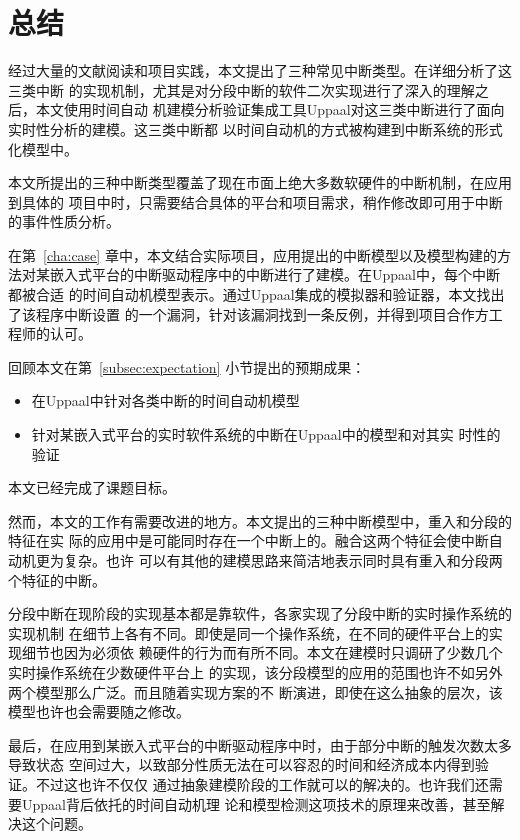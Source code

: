 
\chapter{总结}
\label{cha:sum}

经过大量的文献阅读和项目实践，本文提出了三种常见中断类型。在详细分析了这三类中断
的实现机制，尤其是对分段中断的软件二次实现进行了深入的理解之后，本文使用时间自动
机建模分析验证集成工具Uppaal对这三类中断进行了面向实时性分析的建模。这三类中断都
以时间自动机的方式被构建到中断系统的形式化模型中。

本文所提出的三种中断类型覆盖了现在市面上绝大多数软硬件的中断机制，在应用到具体的
项目中时，只需要结合具体的平台和项目需求，稍作修改即可用于中断的事件性质分析。

在第~\ref{cha:case} 章中，本文结合实际项目，应用提出的中断模型以及模型构建的方
法对某嵌入式平台的中断驱动程序中的中断进行了建模。在Uppaal中，每个中断都被合适
的时间自动机模型表示。通过Uppaal集成的模拟器和验证器，本文找出了该程序中断设置
的一个漏洞，针对该漏洞找到一条反例，并得到项目合作方工程师的认可。

回顾本文在第~\ref{subsec:expectation} 小节提出的预期成果：

\begin{itemize}
	\item 在Uppaal中针对各类中断的时间自动机模型
	\item 针对某嵌入式平台的实时软件系统的中断在Uppaal中的模型和对其实
	时性的验证
\end{itemize}

本文已经完成了课题目标。

然而，本文的工作有需要改进的地方。本文提出的三种中断模型中，重入和分段的特征在实
际的应用中是可能同时存在一个中断上的。融合这两个特征会使中断自动机更为复杂。也许
可以有其他的建模思路来简洁地表示同时具有重入和分段两个特征的中断。

分段中断在现阶段的实现基本都是靠软件，各家实现了分段中断的实时操作系统的实现机制
在细节上各有不同。即使是同一个操作系统，在不同的硬件平台上的实现细节也因为必须依
赖硬件的行为而有所不同。本文在建模时只调研了少数几个实时操作系统在少数硬件平台上
的实现，该分段模型的应用的范围也许不如另外两个模型那么广泛。而且随着实现方案的不
断演进，即使在这么抽象的层次，该模型也许也会需要随之修改。

最后，在应用到某嵌入式平台的中断驱动程序中时，由于部分中断的触发次数太多导致状态
空间过大，以致部分性质无法在可以容忍的时间和经济成本内得到验证。不过这也许不仅仅
通过抽象建模阶段的工作就可以的解决的。也许我们还需要Uppaal背后依托的时间自动机理
论和模型检测这项技术的原理来改善，甚至解决这个问题。

